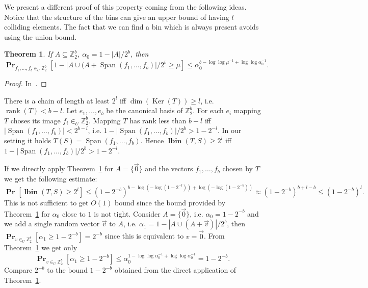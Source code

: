 \documentclass{article}
\newcommand{\lbin}[2]{\operatorname{\mathbf{lbin}}({#1}, {#2})}
\newcommand{\vecspace}[2]{\mathbb{Z}_{#1}^{#2}}
\newcommand{\binvecspace}[1]{\vecspace{2}{#1}}
\newcommand{\probs}[2]{\operatorname{\mathbf{Pr}}_{{#1}}\left[{#2}\right]}
\newtheorem{theorem}{Theorem}
\begin{document}
We present a different proof of this property coming from the following ideas.
Notice that the structure of the bins can give an upper bound of having $l$ colliding elements.
The fact that we can find a bin which is always present avoids using the union bound.

\begin{theorem}
\label{theorem-bound-general}
If $A \subseteq \binvecspace{b}$, $\alpha_0 = 1 - |A|/2^b$, then \[\probs{f_1, \dots, f_b \in_U \binvecspace{b}}{1 - |A \cup (A + \operatorname{Span}(f_1, \dots, f_b)|/2^b \geq \mu} \leq \alpha_0^{b - \log \log \mu^{-1} + \log \log \alpha_0^{-1}}.\]
\end{theorem}
\begin{proof}
In~\cite{alonetal}.
\end{proof}

There is a chain of length at least $2^l$ iff $\operatorname{dim}(\operatorname{Ker}(T)) \geq l$, i.e. $\operatorname{rank}(T) < b - l$.
Let $e_1, \dots, e_b$ be the canonical basis of $\binvecspace{b}$. For each $e_i$ mapping  $T$ choses its image $f_i \in_U \binvecspace{b}$.
Mapping $T$ has rank less than $b - l$ iff $|\operatorname{Span}(f_1, \dots, f_b)| < 2^{b - l}$, i.e. $1 - |\operatorname{Span}(f_1, \dots, f_b)|/2^b > 1 - 2^{-l}$.
In our setting it holds $T(S) = \operatorname{Span}(f_1, \dots, f_b)$.
Hence $\lbin{T}{S} \geq 2^l$ iff $1 - |\operatorname{Span}(f_1, \dots, f_b)|/2^b > 1 - 2^{-l}$.

If we directly apply Theorem~\ref{theorem-bound-general} for $A = \{\vec{0}\}$ and the vectors $f_1, \dots, f_b$ chosen by $T$ we get the following estimate:
\[
\probs{}{\lbin{T}{S} \geq 2^l} \leq (1 - 2^{-b})^{b - \log (-\log (1 - 2^{-l})) + \log (-\log (1 - 2^{-b}))} \approx (1 - 2^{-b})^{b + l - b} \leq (1-2^{-b})^{l}.
\]
This is not sufficient to get $O(1)$ bound since the bound provided by Theorem~\ref{theorem-bound-general} for $\alpha_0$ close to $1$ is not tight.
Consider $A = \{\vec{0}\}$, i.e. $\alpha_0 = 1 - 2^{-b}$ and we add a single random vector $\vec{v}$ to $A$, i.e. $\alpha_1 = 1 - |A \cup (A + \vec{v})|/2^b$, then $\probs{v\in_U\binvecspace{b}}{\alpha_1 \geq 1 - 2^{-b}} = 2^{-b}$ since this is equivalent to $v = \vec{0}$.
From Theorem~\ref{theorem-bound-general} we get only
\[
\probs{v\in_U\binvecspace{b}}{\alpha_1 \geq 1 - 2^{-b}} \leq \alpha_0^{1 - \log \log \alpha_0^{-1} + \log \log \alpha_0^{-1}} = 1 - 2^{-b}.
\]
Compare $2^{-b}$ to the bound $1-2^{-b}$ obtained from the direct application of Theorem~\ref{theorem-bound-general}.
\end{document}
